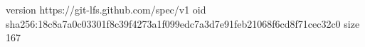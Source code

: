 version https://git-lfs.github.com/spec/v1
oid sha256:18c8a7a0c03301f8c39f4273a1f099edc7a3d7e91feb21068f6cd8f71cec32c0
size 167

